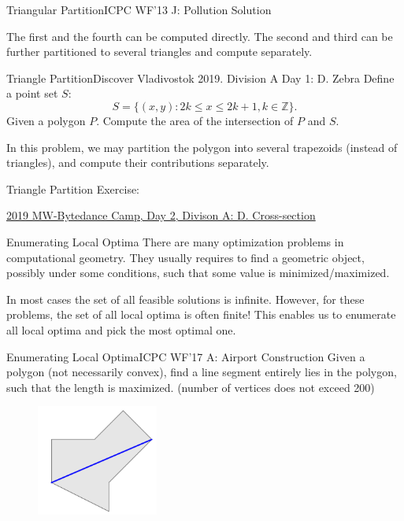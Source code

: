 \documentclass{beamer}
\begin{document}
\begin{frame}{Triangular Partition}{ICPC WF'13 J: Pollution Solution}
\begin{figure}

\end{figure}

\pause

The first and the fourth can be computed directly. The second and third can be further partitioned to several triangles and compute separately.
\end{frame}

\begin{frame}{Triangle Partition}{Discover Vladivostok 2019. Division A Day 1: D. Zebra}
Define a point set $S$:
$$ S = \{(x, y): 2k \leq x \leq 2k + 1, k \in \mathbb{Z}\}. $$
Given a polygon $P$. Compute the area of the intersection of $P$ and $S$.

\pause

In this problem, we may partition the polygon into several trapezoids (instead of triangles), and compute their contributions separately.
\end{frame}

\begin{frame}[fragile]{Triangle Partition}
Exercise:

 \href{https://github.com/wcysai/Calabash/blob/master/ByteDance%20-%20Moscow%20Workshops%20ICPC%20Programming%20Camp%202019.%20Day%202%2C%20Div%20A./statements.pdf}{2019 MW-Bytedance Camp, Day 2, Divison A: D. Cross-section}
\end{frame}

\begin{frame}{Enumerating Local Optima}
There are many optimization problems in computational geometry. They usually requires to find a geometric object, possibly under some conditions, such that some value is minimized/maximized.

In most cases the set of all feasible solutions is infinite. However, for these problems, the set of all local optima is often finite! This enables us to enumerate all local optima and pick the most optimal one.
\end{frame}

\begin{frame}{Enumerating Local Optima}{ICPC WF'17 A: Airport Construction}
Given a polygon (not necessarily convex), find a line segment entirely lies in the polygon, such that the length is maximized. (number of vertices does not exceed 200)

\begin{figure}
	\centering
	\includegraphics[width=4cm]{icpc17a.png}
\end{figure}
\end{frame}
\end{document}
